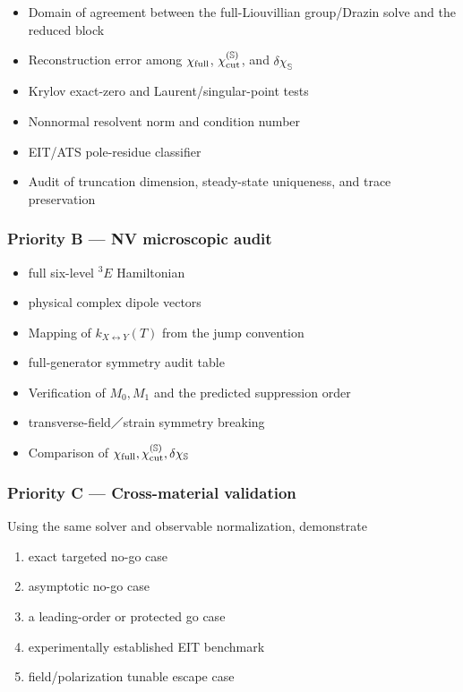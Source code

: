\documentclass[
  10pt,
  a4paper,
]{article}
\providecommand{\tightlist}{%
  \setlength{\itemsep}{0pt}\setlength{\parskip}{0pt}}
\begin{document}
\begin{itemize}
\tightlist
\item
  Domain of agreement between the full-Liouvillian group/Drazin solve
  and the reduced block
\item
  Reconstruction error among \(\chi_{\rm full}\),
  \(\chi_{\rm cut}^{(\mathbb S)}\), and \(\delta\chi_{\mathbb S}\)
\item
  Krylov exact-zero and Laurent/singular-point tests
\item
  Nonnormal resolvent norm and condition number
\item
  EIT/ATS pole-residue classifier
\item
  Audit of truncation dimension, steady-state uniqueness, and trace
  preservation
\end{itemize}

\subsubsection{Priority B --- NV microscopic
audit}\label{priority-b-nv-microscopic-audit}

\begin{itemize}
\tightlist
\item
  full six-level \(^{3}E\) Hamiltonian
\item
  physical complex dipole vectors
\item
  Mapping of \(k_{X\leftrightarrow Y}(T)\) from the jump convention
\item
  full-generator symmetry audit table
\item
  Verification of \(M_0,M_1\) and the predicted suppression order
\item
  transverse-field／strain symmetry breaking
\item
  Comparison of
  \(\chi_{\rm full},\chi_{\rm cut}^{(\mathbb S)},\delta\chi_{\mathbb S}\)
\end{itemize}

\subsubsection{Priority C --- Cross-material
validation}\label{priority-c-cross-material-validation}

Using the same solver and observable normalization, demonstrate

\begin{enumerate}
\def\labelenumi{\arabic{enumi}.}
\tightlist
\item
  exact targeted no-go case
\item
  asymptotic no-go case
\item
  a leading-order or protected go case
\item
  experimentally established EIT benchmark
\item
  field/polarization tunable escape case
\end{enumerate}
\end{document}
